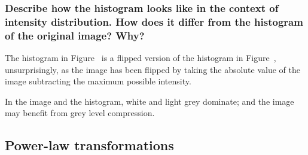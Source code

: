 \documentclass[article, 1.5space, letterpaper, 12pt, oneside, header, footer]{SydeClass}
\begin{document}
\subsubsection{Describe how the histogram looks like in the context of intensity distribution. How does it differ from
the histogram of the original image? Why?}

The histogram in Figure~\label{fig:hist-neg} is a flipped version of the histogram in Figure~\label{fig:hist-original}, unsurprisingly, as the image has been flipped by taking the absolute value of the image subtracting the maximum possible intensity.

In the image and the histogram, white and light grey dominate; and the image may benefit from grey level compression.

\subsection{Power-law transformations}
\end{document}
